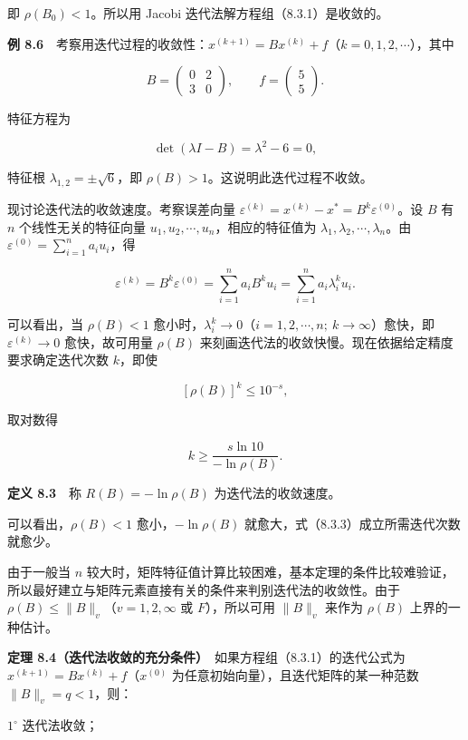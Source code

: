 \documentclass[
  10pt,
  fontset=fandol]{ctexart}
\begin{document}
即 \(\rho(B_0)<1\)。所以用 Jacobi 迭代法解方程组（8.3.1）是收敛的。

\textbf{例 8.6}　考察用迭代过程的收敛性：\(x^{(k+1)}=Bx^{(k)}+f\)（\(k=0,1,2,\cdots\)），其中

\[
B=\begin{pmatrix}0&2\\3&0\end{pmatrix},\qquad f=\begin{pmatrix}5\\5\end{pmatrix}.
\]

特征方程为

\[
\det(\lambda I-B)=\lambda^2-6=0,
\]

特征根 \(\lambda_{1,2}=\pm\sqrt6\)，即 \(\rho(B)>1\)。这说明此迭代过程不收敛。

现讨论迭代法的收敛速度。考察误差向量 \(\varepsilon^{(k)}=x^{(k)}-x^*=B^k\varepsilon^{(0)}\)。设 \(B\) 有 \(n\) 个线性无关的特征向量 \(u_1,u_2,\cdots,u_n\)，相应的特征值为 \(\lambda_1,\lambda_2,\cdots,\lambda_n\)。由 \(\varepsilon^{(0)}=\sum\limits_{i=1}^n a_i u_i\)，得

\[
\varepsilon^{(k)}=B^k\varepsilon^{(0)}=\sum_{i=1}^n a_i B^k u_i=\sum_{i=1}^n a_i\lambda_i^k u_i.
\]

可以看出，当 \(\rho(B)<1\) 愈小时，\(\lambda_i^k\to0\)（\(i=1,2,\cdots,n;\ k\to\infty\)）愈快，即 \(\varepsilon^{(k)}\to0\) 愈快，故可用量 \(\rho(B)\) 来刻画迭代法的收敛快慢。现在依据给定精度要求确定迭代次数 \(k\)，即使

\[
[\rho(B)]^k\leqslant10^{-s},
\tag{8.3.3}
\]

取对数得

\[
k\geqslant\frac{s\ln10}{-\ln\rho(B)}.
\]

\textbf{定义 8.3}　称 \(R(B)=-\ln\rho(B)\) 为迭代法的收敛速度。

可以看出，\(\rho(B)<1\) 愈小，\(-\ln\rho(B)\) 就愈大，式（8.3.3）成立所需迭代次数就愈少。

由于一般当 \(n\) 较大时，矩阵特征值计算比较困难，基本定理的条件比较难验证，所以最好建立与矩阵元素直接有关的条件来判别迭代法的收敛性。由于 \(\rho(B)\leqslant\|B\|_v\)（\(v=1,2,\infty\) 或 \(F\)），所以可用 \(\|B\|_v\) 来作为 \(\rho(B)\) 上界的一种估计。

\textbf{定理 8.4（迭代法收敛的充分条件）}　如果方程组（8.3.1）的迭代公式为 \(x^{(k+1)}=Bx^{(k)}+f\)（\(x^{(0)}\) 为任意初始向量），且迭代矩阵的某一种范数 \(\|B\|_v=q<1\)，则：

\(1^\circ\) 迭代法收敛；
\end{document}
